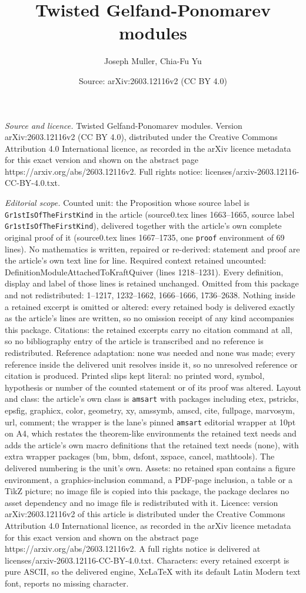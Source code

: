 \documentclass[10pt,a4paper]{amsart}
\title[Twisted Gelfand-Ponomarev modules]{Twisted Gelfand-Ponomarev modules}
\author{Joseph Muller, Chia-Fu Yu}
\date{Source: arXiv:2603.12116v2 (CC BY 4.0)}
\begin{document}
\maketitle

\noindent\emph{Source and licence.} Twisted Gelfand-Ponomarev modules. Version arXiv:2603.12116v2 (CC BY 4.0), distributed under the Creative Commons Attribution 4.0 International licence, as recorded in the arXiv licence metadata for this exact version and shown on the abstract page https://arxiv.org/abs/2603.12116v2. Full rights notice: licenses/arxiv-2603.12116-CC-BY-4.0.txt.\par\smallskip

\noindent\textit{Editorial scope.} Counted unit: the Proposition whose source label is \texttt{Gr1stIsOfTheFirstKind} in the article (source0.tex lines 1663--1665, source label \texttt{Gr1stIsOfTheFirstKind}), delivered together with the article's own complete original proof of it (source0.tex lines 1667--1735, one \texttt{proof} environment of 69 lines). No mathematics is written, repaired or re-derived: statement and proof are the article's own text line for line. Required context retained uncounted: DefinitionModuleAttachedToKraftQuiver (lines 1218--1231). Every definition, display and label of those lines is retained unchanged. Omitted from this package and not redistributed: 1--1217, 1232--1662, 1666--1666, 1736--2638. Nothing inside a retained excerpt is omitted or altered: every retained body is delivered exactly as the article's lines are written, so no omission receipt of any kind accompanies this package. Citations: the retained excerpts carry no citation command at all, so no bibliography entry of the article is transcribed and no reference is redistributed. Reference adaptation: none was needed and none was made; every reference inside the delivered unit resolves inside it, so no unresolved reference or citation is produced. Printed slips kept literal: no printed word, symbol, hypothesis or number of the counted statement or of its proof was altered. Layout and class: the article's own class is \texttt{amsart} with packages including etex, pstricks, epsfig, graphicx, color, geometry, xy, amssymb, amscd, cite, fullpage, marvosym, url, comment; the wrapper is the lane's pinned \texttt{amsart} editorial wrapper at 10pt on A4, which restates the theorem-like environments the retained text needs and adds the article's own macro definitions that the retained text needs (none), with extra wrapper packages (bm, bbm, dsfont, xspace, cancel, mathtools). The delivered numbering is the unit's own. Assets: no retained span contains a figure environment, a graphics-inclusion command, a PDF-page inclusion, a table or a TikZ picture; no image file is copied into this package, the package declares no asset dependency and no image file is redistributed with it. Licence: version arXiv:2603.12116v2 of this article is distributed under the Creative Commons Attribution 4.0 International licence, as recorded in the arXiv licence metadata for this exact version and shown on the abstract page https://arxiv.org/abs/2603.12116v2. A full rights notice is delivered at licenses/arxiv-2603.12116-CC-BY-4.0.txt. Characters: every retained excerpt is pure ASCII, so the delivered engine, XeLaTeX with its default Latin Modern text font, reports no missing character.
\end{document}

